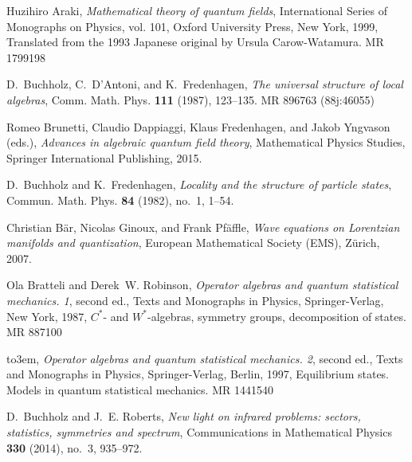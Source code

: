 \documentclass[12pt,a4paper]{article}
\newcommand{\1}{\mathds{1}}                         %
\begin{document}
\providecommand{\bysame}{\leavevmode\hbox to3em{\hrulefill}\thinspace}
\providecommand{\MR}{\relax\ifhmode\unskip\space\fi MR }
\providecommand{\MRhref}[2]{%
	\href{http://www.ams.org/mathscinet-getitem?mr=#1}{#2}
}
\providecommand{\href}[2]{#2}
\small{\begin{thebibliography}{BDFY15}
	
	Huzihiro Araki, \emph{Mathematical theory of quantum fields}, International
	Series of Monographs on Physics, vol. 101, Oxford University Press, New York,
	1999, Translated from the 1993 Japanese original by Ursula Carow-Watamura.
	\MR{1799198}
	
	D.~Buchholz, C.~D'Antoni, and K.~Fredenhagen, \emph{The universal structure of
		local algebras}, Comm. Math. Phys. \textbf{111} (1987), 123--135. \MR{896763
		(88j:46055)}
	
	Romeo Brunetti, Claudio Dappiaggi, Klaus Fredenhagen, and Jakob Yngvason
	(eds.), \emph{Advances in algebraic quantum field theory}, Mathematical
	Physics Studies, Springer International Publishing, 2015.
	
	D.~Buchholz and K.~Fredenhagen, \emph{Locality and the structure of particle
		states}, Commun. Math. Phys. \textbf{84} (1982), no.~1, 1--54.
	
	Christian B{\"{a}}r, Nicolas Ginoux, and Frank Pf{\"{a}}ffle, \emph{Wave
		equations on {L}orentzian manifolds and quantization}, European Mathematical
	Society (EMS), Z{\"{u}}rich, 2007.
	
	Ola Bratteli and Derek~W. Robinson, \emph{Operator algebras and quantum
		statistical mechanics. 1}, second ed., Texts and Monographs in Physics,
	Springer-Verlag, New York, 1987, $C^\ast$- and $W^\ast$-algebras, symmetry
	groups, decomposition of states. \MR{887100}
	
	\bysame, \emph{Operator algebras and quantum statistical mechanics. 2}, second
	ed., Texts and Monographs in Physics, Springer-Verlag, Berlin, 1997,
	Equilibrium states. Models in quantum statistical mechanics. \MR{1441540}
	
	D.~Buchholz and J.~E. Roberts, \emph{New light on infrared problems: sectors,
		statistics, symmetries and spectrum}, Communications in Mathematical Physics
	\textbf{330} (2014), no.~3, 935--972.
	

\end{thebibliography}}
\end{document}
